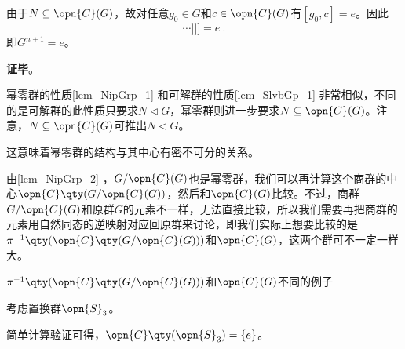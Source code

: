 由于$N\subseteq\opn{C}(G)$，故对任意$g_0\in G$和$c\in\opn{C}(G)$有$[g_0, c]=e$。因此
\begin{equation}
[g_0, [g_1, [g_2\cdots[g_{n-1}, g_n]\cdots]]] =e~. 
\end{equation}
即$G^{n+1}=e$。

\textbf{证毕}。


幂零群的性质\autoref{lem_NipGrp_1} 和可解群的性质\autoref{lem_SlvbGp_1} 非常相似，不同的是可解群的此性质只要求$N\lhd G$，幂零群则进一步要求$N\subseteq \opn{C}(G)$。注意，$N\subseteq \opn{C}(G)$可推出$N\lhd G$。

这意味着幂零群的结构与其中心有密不可分的关系。


由\autoref{lem_NipGrp_2} ，$G/\opn{C}(G)$也是幂零群，我们可以再计算这个商群的中心$\opn{C}\qty(G/\opn{C}(G))$，然后和$\opn{C}(G)$比较。不过，商群$G/\opn{C}(G)$和原群$G$的元素不一样，无法直接比较，所以我们需要再把商群的元素用自然同态的逆映射对应回原群来讨论，即我们实际上想要比较的是$\pi^{-1}\qty(\opn{C}\qty(G/\opn{C}(G)))$和$\opn{C}(G)$，这两个群可不一定一样大。



\begin{example}{$\pi^{-1}\qty(\opn{C}\qty(G/\opn{C}(G)))$和$\opn{C}(G)$不同的例子}

考虑置换群$\opn{S}_3$。

简单计算验证可得，$\opn{C}\qty(\opn{S}_3)=\{e\}$。

\end{example}
























